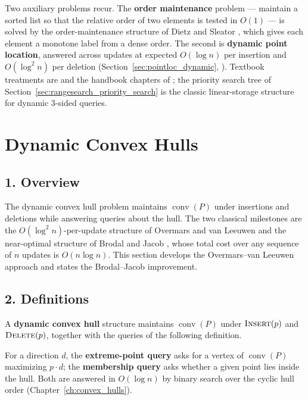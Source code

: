 Two auxiliary problems recur. The \textbf{order maintenance}
problem --- maintain a sorted list so that
the relative order of two elements is tested in $O(1)$ --- is solved by the
order-maintenance structure of Dietz and Sleator \cite{dietzsleator1987},
which gives each element a monotone label from a dense order. The second is
\textbf{dynamic point location}, answered across updates at expected
$O(\log n)$ per insertion and $O(\log^2 n)$ per deletion
(Section~\ref{sec:pointloc_dynamic}, \cite{overmars1983}). Textbook
treatments are \cite{overmars1983,berg2008} and the handbook chapters of
\cite{mehta2005}; the priority search tree of
Section~\ref{sec:rangesearch_priority_search} is the classic linear-storage
structure for dynamic 3-sided queries.


\section{Dynamic Convex Hulls}
\label{sec:dynamic_convex_hulls}

\subsection{1. Overview}

The dynamic convex hull problem maintains $\operatorname{conv}(P)$ under
insertions and deletions while answering queries about the hull. The two
classical milestones are the $O(\log^2 n)$-per-update structure of Overmars
and van Leeuwen \cite{overmars1981} and the near-optimal structure of Brodal
and Jacob \cite{brodal2002}, whose total cost over any sequence of $n$
updates is $O(n\log n)$. This section develops the Overmars--van Leeuwen
approach and states the Brodal--Jacob improvement.

\subsection{2. Definitions}

\begin{definition}\label{def:dyn_convex_hull}
  A \textbf{dynamic convex hull} structure maintains $\operatorname{conv}(P)$
  under $\textsc{Insert}(p)$ and $\textsc{Delete}(p)$, together with the
  queries of the following definition.
\end{definition}

\begin{definition}\label{def:dyn_extreme_query}
  For a direction $d$, the \textbf{extreme-point query} asks for a vertex of
  $\operatorname{conv}(P)$ maximizing $p \cdot d$; the \textbf{membership
  query} asks whether a given point lies inside the hull. Both are answered
  in $O(\log n)$ by binary search over the cyclic hull order
  (Chapter~\ref{ch:convex_hulls}).
\end{definition}


